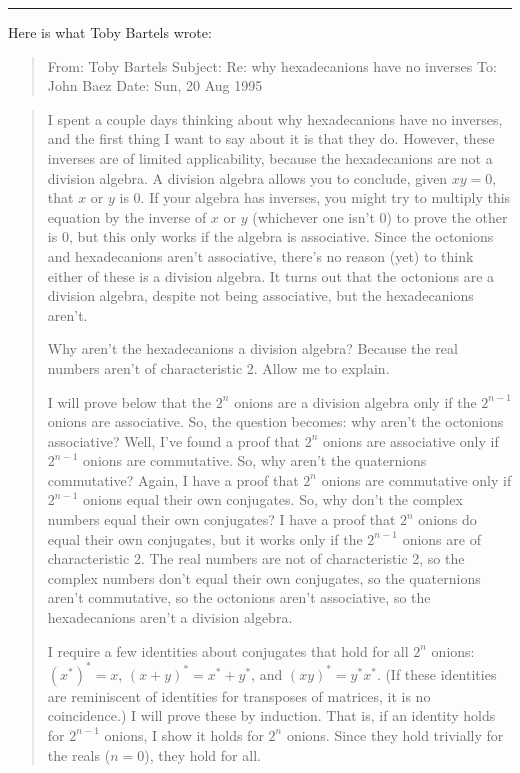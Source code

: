 \documentclass{article}
\begin{document}
\begin{center}\rule{0.5\linewidth}{0.5pt}\end{center}

Here is what Toby Bartels wrote:

\begin{quote}
From: Toby Bartels Subject: Re: why hexadecanions have no inverses To:
John Baez Date: Sun, 20 Aug 1995
\end{quote}

\begin{quote}
I spent a couple days thinking about why hexadecanions have no inverses,
and the first thing I want to say about it is that they do. However,
these inverses are of limited applicability, because the hexadecanions
are not a division algebra. A division algebra allows you to conclude,
given \(x y = 0\), that \(x\) or \(y\) is \(0\). If your algebra has
inverses, you might try to multiply this equation by the inverse of
\(x\) or \(y\) (whichever one isn't \(0\)) to prove the other is \(0\),
but this only works if the algebra is associative. Since the octonions
and hexadecanions aren't associative, there's no reason (yet) to think
either of these is a division algebra. It turns out that the octonions
are a division algebra, despite not being associative, but the
hexadecanions aren't.

Why aren't the hexadecanions a division algebra? Because the real
numbers aren't of characteristic 2. Allow me to explain.

I will prove below that the \(2^n\) onions are a division algebra only
if the \(2^{n-1}\) onions are associative. So, the question becomes: why
aren't the octonions associative? Well, I've found a proof that \(2^n\)
onions are associative only if \(2^{n-1}\) onions are commutative. So,
why aren't the quaternions commutative? Again, I have a proof that
\(2^n\) onions are commutative only if \(2^{n-1}\) onions equal their
own conjugates. So, why don't the complex numbers equal their own
conjugates? I have a proof that \(2^n\) onions do equal their own
conjugates, but it works only if the \(2^{n-1}\) onions are of
characteristic 2. The real numbers are not of characteristic 2, so the
complex numbers don't equal their own conjugates, so the quaternions
aren't commutative, so the octonions aren't associative, so the
hexadecanions aren't a division algebra.

I require a few identities about conjugates that hold for all \(2^n\)
onions: \((x^*)^* = x\), \((x + y)^* = x^* + y^*\), and
\((x y)^* = y^* x^*\). (If these identities are reminiscent of
identities for transposes of matrices, it is no coincidence.) I will
prove these by induction. That is, if an identity holds for \(2^{n-1}\)
onions, I show it holds for \(2^n\) onions. Since they hold trivially
for the reals (\(n = 0\)), they hold for all.


\end{quote}
\end{document}
